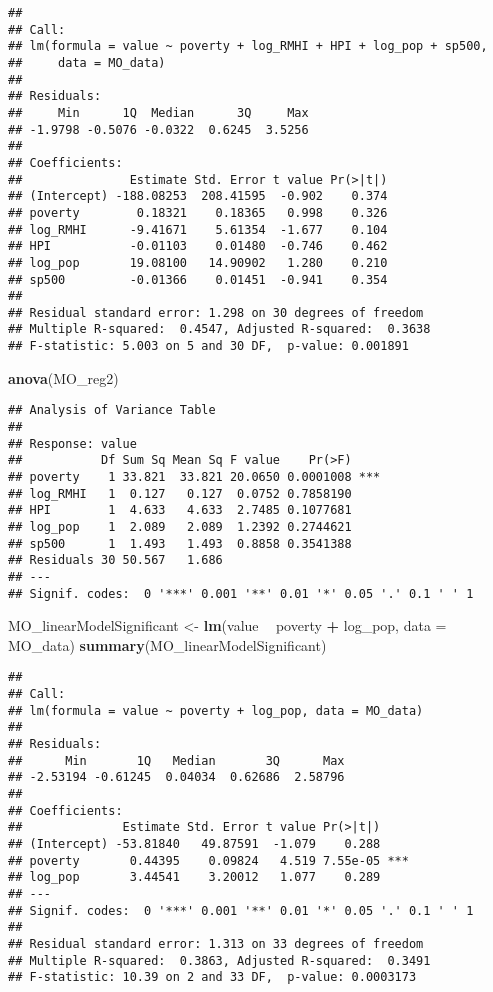 \documentclass[
]{article}
\newenvironment{Shaded}{\begin{snugshade}}{\end{snugshade}}
\newcommand{\DataTypeTok}[1]{\textcolor[rgb]{0.13,0.29,0.53}{#1}}
\newcommand{\KeywordTok}[1]{\textcolor[rgb]{0.13,0.29,0.53}{\textbf{#1}}}
\newcommand{\NormalTok}[1]{#1}
\newcommand{\OperatorTok}[1]{\textcolor[rgb]{0.81,0.36,0.00}{\textbf{#1}}}
\newcommand{\StringTok}[1]{\textcolor[rgb]{0.31,0.60,0.02}{#1}}
\begin{document}
\begin{verbatim}
## 
## Call:
## lm(formula = value ~ poverty + log_RMHI + HPI + log_pop + sp500, 
##     data = MO_data)
## 
## Residuals:
##     Min      1Q  Median      3Q     Max 
## -1.9798 -0.5076 -0.0322  0.6245  3.5256 
## 
## Coefficients:
##               Estimate Std. Error t value Pr(>|t|)
## (Intercept) -188.08253  208.41595  -0.902    0.374
## poverty        0.18321    0.18365   0.998    0.326
## log_RMHI      -9.41671    5.61354  -1.677    0.104
## HPI           -0.01103    0.01480  -0.746    0.462
## log_pop       19.08100   14.90902   1.280    0.210
## sp500         -0.01366    0.01451  -0.941    0.354
## 
## Residual standard error: 1.298 on 30 degrees of freedom
## Multiple R-squared:  0.4547, Adjusted R-squared:  0.3638 
## F-statistic: 5.003 on 5 and 30 DF,  p-value: 0.001891
\end{verbatim}

\begin{Shaded}
\begin{Highlighting}[]
\KeywordTok{anova}\NormalTok{(MO_reg2)}
\end{Highlighting}
\end{Shaded}

\begin{verbatim}
## Analysis of Variance Table
## 
## Response: value
##           Df Sum Sq Mean Sq F value    Pr(>F)    
## poverty    1 33.821  33.821 20.0650 0.0001008 ***
## log_RMHI   1  0.127   0.127  0.0752 0.7858190    
## HPI        1  4.633   4.633  2.7485 0.1077681    
## log_pop    1  2.089   2.089  1.2392 0.2744621    
## sp500      1  1.493   1.493  0.8858 0.3541388    
## Residuals 30 50.567   1.686                      
## ---
## Signif. codes:  0 '***' 0.001 '**' 0.01 '*' 0.05 '.' 0.1 ' ' 1
\end{verbatim}

\begin{Shaded}
\begin{Highlighting}[]
\NormalTok{MO_linearModelSignificant <-}\StringTok{ }\KeywordTok{lm}\NormalTok{(value }\OperatorTok{~}\StringTok{ }\NormalTok{poverty }\OperatorTok{+}\StringTok{ }\NormalTok{log_pop, }\DataTypeTok{data =}\NormalTok{ MO_data)}
\KeywordTok{summary}\NormalTok{(MO_linearModelSignificant)}
\end{Highlighting}
\end{Shaded}

\begin{verbatim}
## 
## Call:
## lm(formula = value ~ poverty + log_pop, data = MO_data)
## 
## Residuals:
##      Min       1Q   Median       3Q      Max 
## -2.53194 -0.61245  0.04034  0.62686  2.58796 
## 
## Coefficients:
##              Estimate Std. Error t value Pr(>|t|)    
## (Intercept) -53.81840   49.87591  -1.079    0.288    
## poverty       0.44395    0.09824   4.519 7.55e-05 ***
## log_pop       3.44541    3.20012   1.077    0.289    
## ---
## Signif. codes:  0 '***' 0.001 '**' 0.01 '*' 0.05 '.' 0.1 ' ' 1
## 
## Residual standard error: 1.313 on 33 degrees of freedom
## Multiple R-squared:  0.3863, Adjusted R-squared:  0.3491 
## F-statistic: 10.39 on 2 and 33 DF,  p-value: 0.0003173
\end{verbatim}
\end{document}

